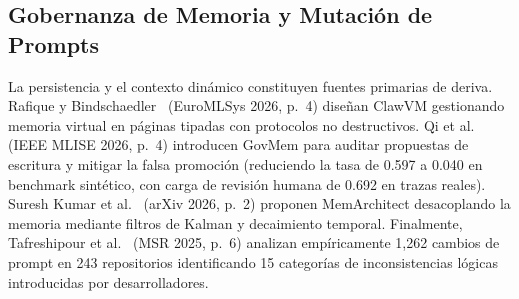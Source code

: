 \documentclass[conference]{IEEEtran}
\begin{document}
\subsection{Gobernanza de Memoria y Mutaci\'on de Prompts}
La persistencia y el contexto din\'amico constituyen fuentes primarias de deriva. Rafique y Bindschaedler~\cite{rafique2026} (EuroMLSys 2026, p.~4) dise\~nan ClawVM gestionando memoria virtual en p\'aginas tipadas con protocolos no destructivos. Qi et al.~\cite{qi2026} (IEEE MLISE 2026, p.~4) introducen GovMem para auditar propuestas de escritura y mitigar la falsa promoci\'on (reduciendo la tasa de 0.597 a 0.040 en benchmark sint\'etico, con carga de revisi\'on humana de 0.692 en trazas reales). Suresh Kumar et al.~\cite{sureshkumar2026} (arXiv 2026, p.~2) proponen MemArchitect desacoplando la memoria mediante filtros de Kalman y decaimiento temporal. Finalmente, Tafreshipour et al.~\cite{tafreshipour2025} (MSR 2025, p.~6) analizan emp\'iricamente 1,262 cambios de prompt en 243 repositorios identificando 15 categor\'ias de inconsistencias l\'ogicas introducidas por desarrolladores.
\end{document}
